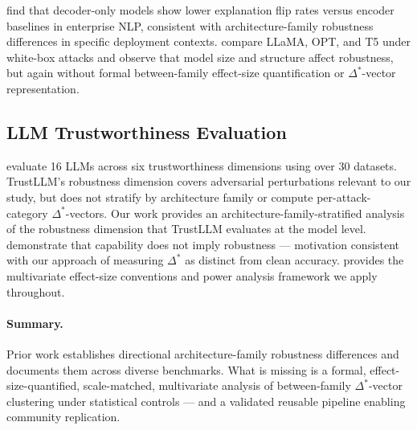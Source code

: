 \citet{Zhang2026Robust} find that decoder-only models show lower explanation flip rates versus
encoder baselines in enterprise NLP, consistent with architecture-family robustness differences in
specific deployment contexts. \citet{Yang2024Assessing} compare LLaMA, OPT, and T5 under white-box
attacks and observe that model size and structure affect robustness, but again without formal
between-family effect-size quantification or $\Delta^*$-vector representation.

\subsection{LLM Trustworthiness Evaluation}

\citet{Sun2024TrustLLM} evaluate 16 LLMs across six trustworthiness dimensions using over 30
datasets. TrustLLM's robustness dimension covers adversarial perturbations relevant to our study,
but does not stratify by architecture family or compute per-attack-category $\Delta^*$-vectors.
Our work provides an architecture-family-stratified analysis of the robustness dimension that
TrustLLM evaluates at the model level. \citet{Otmakhova2025FLUKE} demonstrate that capability
does not imply robustness --- motivation consistent with our approach of measuring $\Delta^*$ as
distinct from clean accuracy. \citet{Cohen1988Statistical} provides the multivariate effect-size
conventions and power analysis framework we apply throughout.

\paragraph{Summary.} Prior work establishes directional architecture-family robustness differences
and documents them across diverse benchmarks. What is missing is a formal, effect-size-quantified,
scale-matched, multivariate analysis of between-family $\Delta^*$-vector clustering under
statistical controls --- and a validated reusable pipeline enabling community replication.
